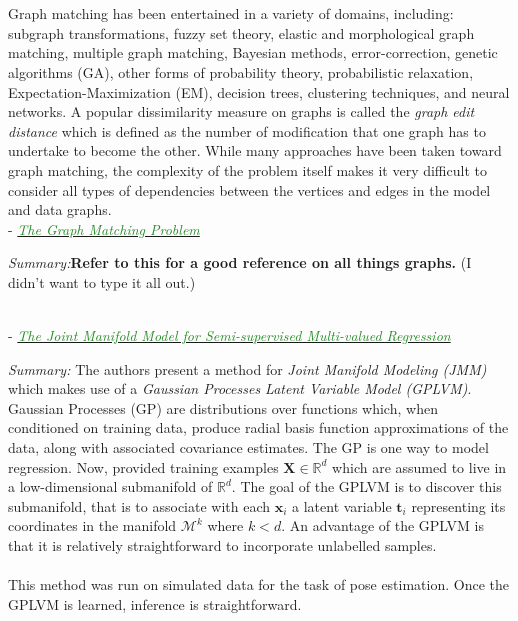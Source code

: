 \documentclass[]{article}
\newcommand{\paperentry}[4]{
            \hangindent=1cm
            \textcolor{red}{\cite{#1}} - \href{run:../References/#3}{\textcolor{ForestGreen}{\textit{#2}}}
            
            \noindent            
            \begin{minipage}[t]{0.1\linewidth}\hfill\end{minipage}
            \begin{minipage}[t]{0.8\linewidth}\textcolor{NavyBlue}{{\textit{Summary:}}}#4\end{minipage}
            \vspace{.25cm}
          }
\begin{document}
		\\ \\
		Graph matching has been entertained in a variety of domains, including: subgraph transformations, fuzzy set theory, elastic and morphological graph matching, multiple graph matching, Bayesian methods, error-correction, genetic algorithms (GA), other forms of probability theory, probabilistic relaxation, Expectation-Maximization (EM), decision trees, clustering techniques, and neural networks.  A popular dissimilarity measure on graphs is called the \textit{graph edit distance} which is defined as the number of modification that one graph has to undertake to become the other.  While many approaches have been taken toward graph matching, the complexity of the problem itself makes it very difficult to consider all types of dependencies between the vertices and edges in the model and data graphs. \\
		
		\paperentry{Livi2013GraphMatchingProblem}
		{The Graph Matching Problem}
		{Manifold_Representation_Learning/Alignment/Livi2013GraphMatchingProblem.pdf}
		{\textbf{Refer to this for a good reference on all things graphs.}  (I didn't want to type it all out.)}\\
	
		\paperentry{Navaratnam2007JointManifoldSemiSupRegression}
		{The Joint Manifold Model for Semi-supervised Multi-valued Regression}
		{Manifold_Representation_Learning/Alignment/Navaratnam2007JointManifoldSemiSupRegression.pdf}
		{
		The authors present a method for \textit{Joint Manifold Modeling (JMM)} which makes use of a \textit{Gaussian Processes Latent Variable Model (GPLVM)}.  Gaussian Processes (GP) are distributions over functions which, when conditioned on training data, produce radial basis function approximations of the data, along with associated covariance estimates.  The GP is one way to model regression.  Now, provided training examples $\bm{X}\in\mathbb{R}^{d}$ which are assumed to live in a low-dimensional submanifold of $\mathbb{R}^{d}$.  The goal of the GPLVM is to discover this submanifold, that is to associate with each $\bm{x}_{i}$ a latent variable $\bm{t}_{i}$ representing its coordinates in the manifold $\mathcal{M}^{k}$ where $k < d$. An advantage of the GPLVM is that it is relatively straightforward to incorporate unlabelled samples.
		\\ \\
		This method was run on simulated data for the task of pose estimation.  Once the GPLVM is learned, inference is straightforward.}\\
		
\end{document}
